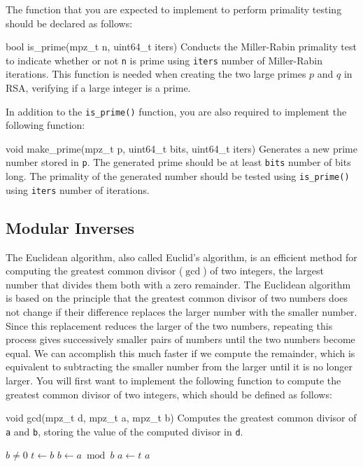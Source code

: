 The function that you are expected to implement to perform primality
testing should be declared as follows:

\begin{funcdoc}{bool is\_prime(mpz\_t n, uint64\_t iters)}
  Conducts the Miller-Rabin primality test to indicate whether or not
  \texttt{n} is prime using \texttt{iters} number of Miller-Rabin
  iterations. This function is needed when creating the two large primes
  $p$ and $q$ in RSA, verifying if a large integer is a prime.
\end{funcdoc}

In addition to the \texttt{is\_prime()} function, you are also required
to implement the following function:

\begin{funcdoc}{void make\_prime(mpz\_t p, uint64\_t bits, uint64\_t
  iters)}
  Generates a new prime number stored in \texttt{p}. The generated prime
  should be at least \texttt{bits} number of bits long. The primality of
  the generated number should be tested using \texttt{is\_prime()} using
  \texttt{iters} number of iterations.
\end{funcdoc}

\subsection{Modular Inverses}

The Euclidean algorithm, also called  Euclid's algorithm, is an
efficient method for computing the greatest common divisor ($\gcd$) of
two integers, the largest number that divides them both with a zero
remainder. The Euclidean algorithm is based on the principle that the
greatest common divisor of two numbers does not change if their
difference replaces the larger number with the smaller number. Since
this replacement reduces the larger of the two numbers, repeating this
process gives successively smaller pairs of numbers until the two
numbers become equal. We can accomplish this much faster if we compute
the remainder, which is equivalent to subtracting the smaller number
from the larger until it is no longer larger. You will first want to
implement the following function to compute the greatest common divisor
of two integers, which should be defined as follows:

\begin{funcdoc}{void gcd(mpz\_t d, mpz\_t a, mpz\_t b)}
  Computes the greatest common divisor of \texttt{a} and \texttt{b},
  storing the value of the computed divisor in \texttt{d}.

  \begin{codebox}
    \li \While $b \ne 0$
    \li \Then $t \gets b$
    \li       $b \gets a \bmod b$
    \li       $a \gets t$
        \End
    \li \Return $a$
  \end{codebox}
\end{funcdoc}

